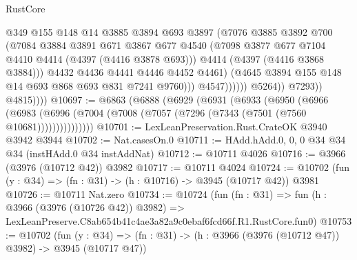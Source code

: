 \begin{lexlean}{RustCore}
\begin{coremodule}
                                    @349
                                    @155
                                    @148
                                    @14
                                    @3885
                                    @3894
                                    @693
                                    @3897
                                    (@7076
                                      @3885
                                      @3892
                                      @700
                                      (@7084
                                        @3884
                                        @3891
                                        @671
                                        @3867
                                        @677
                                        @4540
                                        (@7098
                                          @3877
                                          @677
                                          @7104
                                          @4410
                                          @4414
                                          (@4397 (@4416 @3878 @693)))
                                        @4414
                                        (@4397 (@4416 @3868 @3884)))
                                      @4432
                                      @4436
                                      @4441
                                      @4446
                                      @4452
                                      @4461)
                                    (@4645 @3894 @155 @148 @14 @693 @868 @693 @831 @7241 @9760)))
                                @4547))))))
                    @5264))
                @7293))
            @4815))))
@10697 := @6863
    (@6888
      (@6929
        (@6931
          (@6933
            (@6950
              (@6966
                (@6983 (@6996 (@7004 (@7008 (@7057 (@7296 (@7343 (@7501 (@7560 @10681)))))))))))))))
@10701 := LexLeanPreservation.Rust.CrateOK @3940 @3942 @3944
@10702 := Nat.casesOn.{0}
@10711 := HAdd.hAdd.{0, 0, 0} @34 @34 @34 (instHAdd.{0} @34 instAddNat)
@10712 := @10711 @4026
@10716 := @3966 (@3976 (@10712 @42)) @3982
@10717 := @10711 @4024
@10724 := @10702 (fun (y : @34) => (fn : @31) -> (h : @10716) -> @3945 (@10717 @42)) @3981
@10726 := @10711 Nat.zero
@10734 := @10724
    (fun (fn : @31) =>
    fun (h : @3966 (@3976 (@10726 @42)) @3982) =>
    LexLeanPreserve.C8ab654b41c4ae3a82a9c0ebaf6fcd66f.R1.RustCore.fun0)
@10753 := @10702
    (fun (y : @34) => (fn : @31) -> (h : @3966 (@3976 (@10712 @47)) @3982) -> @3945 (@10717 @47))

\end{coremodule}
\end{lexlean}
